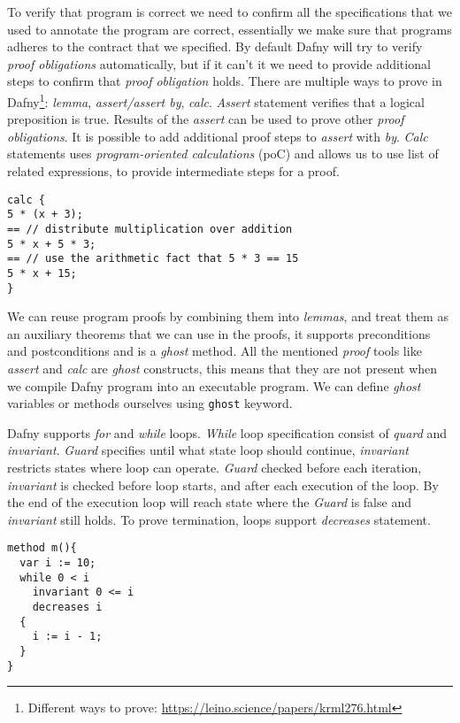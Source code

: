 To verify that program is correct we need to confirm all the specifications that we used to annotate the program are correct, essentially we make sure that programs adheres to the contract that we specified. By default Dafny will try to verify \textit{proof obligations} automatically, but if it can't it we need to provide additional steps to confirm that \textit{proof obligation} holds. There are multiple ways to prove in Dafny\footnote{Different ways to prove: \url{https://leino.science/papers/krml276.html}}: \textit{lemma}, \textit{assert/assert by}, \textit{calc}. \textit{Assert} statement verifies that a logical preposition is true. Results of the \textit{assert} can be used to prove other \textit{proof obligations}. It is possible to add additional proof steps to \textit{assert} with \textit{by}. \textit{Calc} statements uses \textit{program-oriented calculations} (poC) \cite{Leino2014} and allows us to use list of related expressions, to provide intermediate steps for a proof.

\begin{lstlisting}[language=Dafny,caption={Calc statement, taken from\cite{Leino2023} },label={lst:calc}]
calc {
5 * (x + 3);
== // distribute multiplication over addition
5 * x + 5 * 3;
== // use the arithmetic fact that 5 * 3 == 15
5 * x + 15;
}
\end{lstlisting}

We can reuse program proofs by combining them into \textit{lemmas}, and treat them as an auxiliary theorems that we can use in the proofs, it supports preconditions and postconditions and is a \textit{ghost} method. All the mentioned \textit{proof} tools like \textit{assert} and \textit{calc} are \textit{ghost} constructs, this means that they are not present when we compile Dafny program into an executable program. We can define \textit{ghost} variables or methods ourselves using \texttt{ghost} keyword.

Dafny supports \textit{for} and \textit{while} loops. \textit{While} loop specification consist of \textit{quard} and \textit{invariant}. \textit{Guard} specifies until what state loop should continue, \textit{invariant} restricts states where loop can operate. \textit{Guard} checked before each iteration, \textit{invariant} is checked before loop starts, and after each execution of the loop. By the end of the execution loop will reach state where the \textit{Guard} is false and \textit{invariant} still holds. To prove termination, loops support \textit{decreases} statement.

\begin{lstlisting}[language=Dafny,caption={While loop },label={lst:whileloop}]
method m(){
  var i := 10;
  while 0 < i
    invariant 0 <= i
    decreases i
  {
    i := i - 1;
  }
}
\end{lstlisting}

